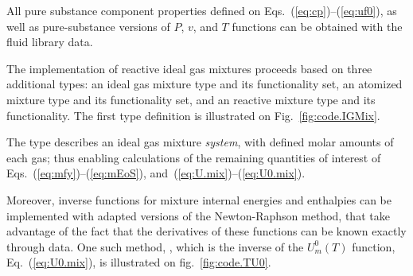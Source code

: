     All pure substance component properties defined on Eqs.~(\ref{eq:cp})--(\ref{eq:uf0}), as well as pure-substance versions of $P$, $v$, and $T$ functions can be obtained with the  
    fluid library data.

    The implementation of reactive ideal gas mixtures proceeds based on three additional types: an  ideal gas mixture type and  its  functionality  set,  an    atomized
    mixture type and its functionality set, and an  reactive mixture type and its functionality. The first type definition is illustrated on Fig.~\ref{fig:code.IGMix}.


    The  type describes an ideal gas mixture \emph{system}, with defined molar amounts of each  gas;  thus  enabling  calculations  of  the  remaining  quantities  of  interest  of
    Eqs.~(\ref{eq:mfy})--(\ref{eq:mEoS}), and~(\ref{eq:U.mix})--(\ref{eq:U0.mix}).

    Moreover, inverse functions for mixture internal energies and enthalpies can be implemented with adapted versions of the Newton-Raphson method, that take advantage of  the  fact  that  the
    derivatives of these functions can be known exactly through  data. One such method, , which is the  inverse  of  the  $U^0_m(T)$  function,  Eq.~(\ref{eq:U0.mix}),  is
    illustrated on fig.~\ref{fig:code.TU0}.


